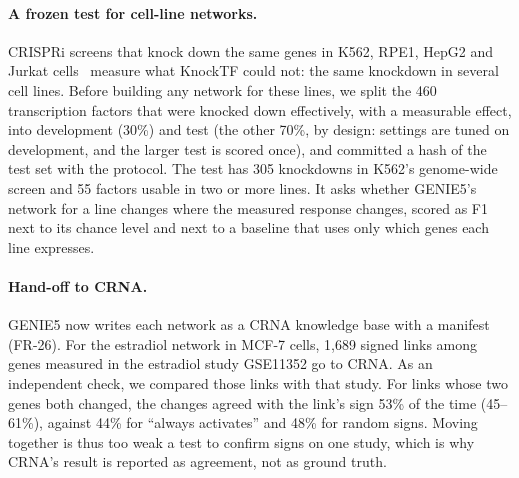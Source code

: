 \documentclass[11pt,a4paper]{article}
\newcommand{\gen}{GENIE5}
\begin{document}
\paragraph{A frozen test for cell-line networks.} CRISPRi screens that knock down the same genes
in K562, RPE1, HepG2 and Jurkat cells~\cite{perturbseq,nadig} measure what KnockTF could not: the
same knockdown in several cell lines. Before building any network for these lines, we split the
460 transcription factors that were knocked down effectively, with a measurable effect, into
development (30\%) and test (the other 70\%, by design: settings are tuned on development, and
the larger test is scored once), and committed a hash of the test set with the protocol. The
test has 305 knockdowns in K562's genome-wide screen and 55 factors usable in two or more lines.
It asks whether \gen{}'s network for a line changes where the measured response changes,
scored as F1 next to its chance level and next to a baseline that uses only which genes each
line expresses.

\paragraph{Hand-off to CRNA.} \gen{} now writes each network as a CRNA knowledge base with a
manifest (FR-26). For the estradiol network in MCF-7 cells, 1,689 signed links among genes
measured in the estradiol study GSE11352 go to CRNA. As an independent check, we compared those
links with that study. For links whose two genes both changed, the changes agreed with the link's
sign 53\% of the time (45--61\%), against 44\% for ``always activates'' and 48\% for random
signs. Moving together is thus too weak a test to confirm signs on one study, which is why
CRNA's result is reported as agreement, not as ground truth.
\end{document}
